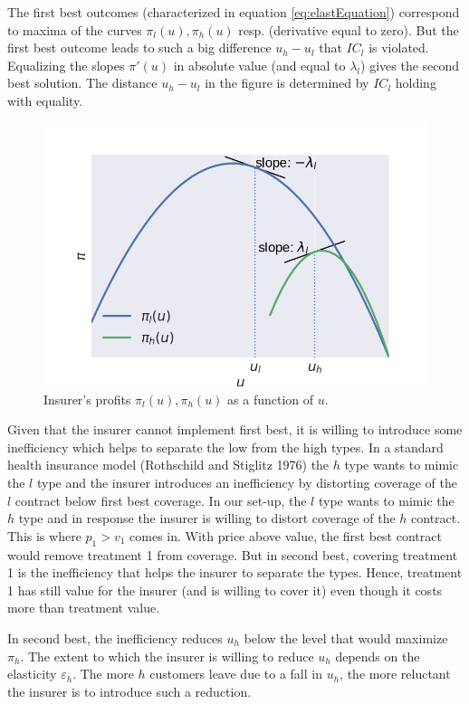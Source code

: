 \documentclass[a4paper,12pt]{article}
\makeatletter
\newcommand{\citeprocitem}[2]{\hyper@linkstart{cite}{citeproc_bib_item_#1}#2\hyper@linkend}
\makeatother
\begin{document}
The first best outcomes (characterized in equation \eqref{eq:elastEquation}) correspond to maxima of the curves \(\pi_l(u),\pi_h(u)\) resp. (derivative equal to zero). But the first best outcome leads to such a big difference \(u_h-u_l\) that \(IC_l\) is violated. Equalizing the slopes \(\pi'(u)\) in absolute value (and equal to \(\lambda_l\)) gives the second best solution. The distance \(u_h - u_l\) in the figure is determined by \(IC_l\) holding with equality.


\begin{figure}[htbp]
\centering
\includegraphics[width=.9\linewidth]{profitfunctions.png}
\caption{\label{fig:profitfunctions}Insurer's profits \(\pi_{l}(u),\pi_{h}(u)\) as a function of \(u\).}
\end{figure}

Given that the insurer cannot implement first best, it is willing to introduce some inefficiency which helps to separate the low from the high types. In a standard health insurance model (\citeprocitem{34}{Rothschild and Stiglitz 1976}) the \(h\) type wants to mimic the \(l\) type and the insurer introduces an inefficiency by distorting coverage of the \(l\) contract below first best coverage. In our set-up, the \(l\) type wants to mimic the \(h\) type and in response the insurer is willing to distort coverage of the \(h\) contract. This is where \(p_1>v_1\) comes in. With price above value, the first best contract would remove treatment 1 from coverage. But in second best, covering treatment 1 is the inefficiency that helps the insurer to separate the types. Hence, treatment 1 has still value for the insurer (and is willing to cover it) even though it costs more than treatment value.

In second best, the inefficiency reduces \(u_h\) below the level that would maximize \(\pi_h\). The extent to which the insurer is willing to reduce \(u_h\) depends on the elasticity \(\varepsilon_h\). The more \(h\) customers leave due to a fall in \(u_h\), the more reluctant the insurer is to introduce such a reduction.
\end{document}
